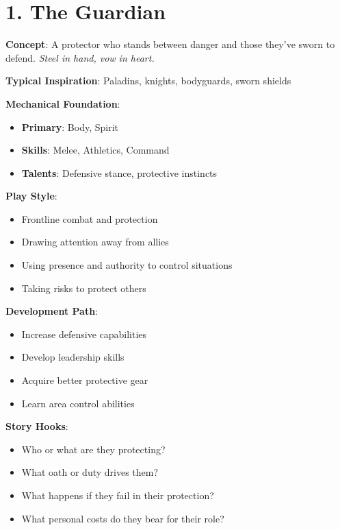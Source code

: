 \section{1. The Guardian}

\textbf{Concept}: A protector who stands between danger and those they've sworn to defend. \emph{Steel in hand, vow in heart.}

\textbf{Typical Inspiration}: Paladins, knights, bodyguards, sworn shields

\textbf{Mechanical Foundation}:
\begin{itemize}
\item \textbf{Primary}: Body, Spirit
\item \textbf{Skills}: Melee, Athletics, Command
\item \textbf{Talents}: Defensive stance, protective instincts
\end{itemize}

\textbf{Play Style}:
\begin{itemize}
\item Frontline combat and protection
\item Drawing attention away from allies
\item Using presence and authority to control situations
\item Taking risks to protect others
\end{itemize}

\textbf{Development Path}:
\begin{itemize}
\item Increase defensive capabilities
\item Develop leadership skills
\item Acquire better protective gear
\item Learn area control abilities
\end{itemize}

\textbf{Story Hooks}:
\begin{itemize}
\item Who or what are they protecting?
\item What oath or duty drives them?
\item What happens if they fail in their protection?
\item What personal costs do they bear for their role?
\end{itemize}

